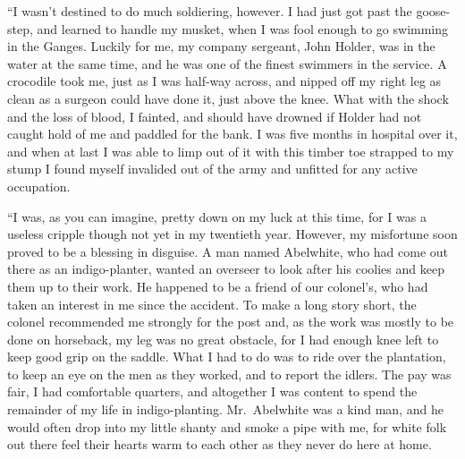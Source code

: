 \documentclass[12pt,english,oneside]{book}
\begin{document}
{}``I wasn't destined to do much soldiering, however. I had just
got past the goose-step, and learned to handle my musket, when I was
fool enough to go swimming in the Ganges. Luckily for me, my company
sergeant, John Holder, was in the water at the same time, and he was
one of the finest swimmers in the service. A crocodile took me, just
as I was half-way across, and nipped off my right leg as clean as
a surgeon could have done it, just above the knee. What with the shock
and the loss of blood, I fainted, and should have drowned if Holder
had not caught hold of me and paddled for the bank. I was five months
in hospital over it, and when at last I was able to limp out of it
with this timber toe strapped to my stump I found myself invalided
out of the army and unfitted for any active occupation.

{}``I was, as you can imagine, pretty down on my luck at this time,
for I was a useless cripple though not yet in my twentieth year. However,
my misfortune soon proved to be a blessing in disguise. A man named
Abelwhite, who had come out there as an indigo-planter, wanted an
overseer to look after his coolies and keep them up to their work.
He happened to be a friend of our colonel's, who had taken an interest
in me since the accident. To make a long story short, the colonel
recommended me strongly for the post and, as the work was mostly to
be done on horseback, my leg was no great obstacle, for I had enough
knee left to keep good grip on the saddle. What I had to do was to
ride over the plantation, to keep an eye on the men as they worked,
and to report the idlers. The pay was fair, I had comfortable quarters,
and altogether I was content to spend the remainder of my life in
indigo-planting. Mr.\ Abelwhite was a kind man, and he would often
drop into my little shanty and smoke a pipe with me, for white folk
out there feel their hearts warm to each other as they never do here
at home.
\end{document}

